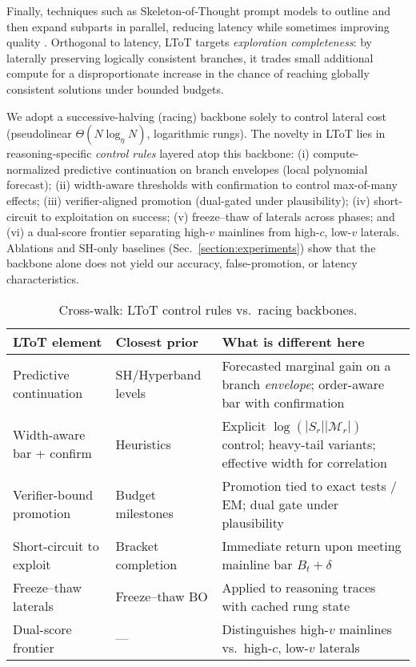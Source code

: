 \documentclass{article}
\begin{document}
Finally, techniques such as Skeleton‑of‑Thought prompt models to outline and then expand subparts in parallel, reducing latency while sometimes improving quality \citep{ning2023sot}. Orthogonal to latency, LToT targets \emph{exploration completeness}: by laterally preserving logically consistent branches, it trades small additional compute for a disproportionate increase in the chance of reaching globally consistent solutions under bounded budgets.

We adopt a successive-halving (racing) backbone solely to control lateral cost (pseudolinear $\Theta(N\log_\eta N)$, logarithmic rungs).
The novelty in LToT lies in reasoning-specific \emph{control rules} layered atop this backbone:
(i) compute-normalized predictive continuation on branch envelopes (local polynomial forecast);
(ii) width-aware thresholds with confirmation to control max-of-many effects;
(iii) verifier-aligned promotion (dual-gated under plausibility);
(iv) short-circuit to exploitation on success;
(v) freeze--thaw of laterals across phases; and
(vi) a dual-score frontier separating high-$v$ mainlines from high-$c$, low-$v$ laterals.
Ablations and SH-only baselines (Sec.~\ref{section:experiments}) show that the backbone alone does not yield our accuracy, false-promotion, or latency characteristics.

\begin{table}[t]
\centering
\small
\begin{tabular}{@{}p{2.9cm}p{3.0cm}p{6.7cm}@{}}
\toprule
\textbf{LToT element} & \textbf{Closest prior} & \textbf{What is different here} \\
\midrule
Predictive continuation & SH/Hyperband levels & Forecasted marginal gain on a branch \emph{envelope}; order-aware bar with confirmation \\
Width-aware bar + confirm & Heuristics & Explicit $\log(|S_r||\mathcal{M}_r|)$ control; heavy-tail variants; effective width for correlation \\
Verifier-bound promotion & Budget milestones & Promotion tied to exact tests / EM; dual gate under plausibility \\
Short-circuit to exploit & Bracket completion & Immediate return upon meeting mainline bar $B_t+\delta$ \\
Freeze--thaw laterals & Freeze--thaw BO & Applied to reasoning traces with cached rung state \\
Dual-score frontier & --- & Distinguishes high-$v$ mainlines vs.\ high-$c$, low-$v$ laterals \\
\bottomrule
\end{tabular}
\caption{Cross-walk: LToT control rules vs.\ racing backbones.}
\end{table}
\end{document}
